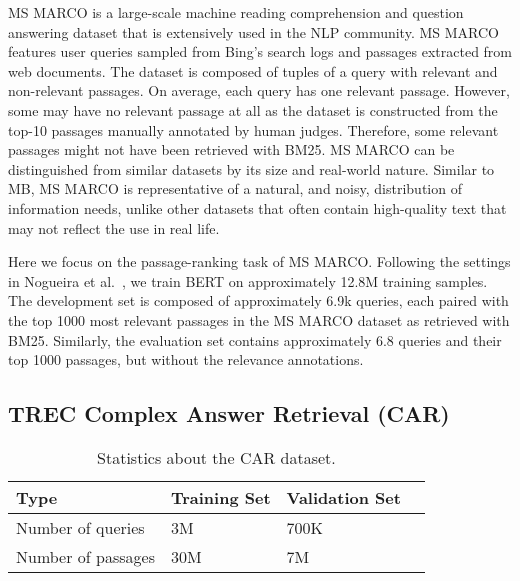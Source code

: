 MS MARCO is a large-scale machine reading comprehension and question answering dataset that is extensively used in the NLP community.
MS MARCO~\cite{nguyen2016msmarco} features user queries sampled from Bing’s search logs and passages extracted from web documents.
The dataset is composed of tuples of a query with relevant and non-relevant passages.
On average, each query has one relevant passage.
However, some may have no relevant passage at all as the dataset is constructed from the top-10 passages manually annotated by human judges.
Therefore, some relevant passages might not have been retrieved with BM25.
MS MARCO can be distinguished from similar datasets by its size and real-world nature.
Similar to MB, MS MARCO is representative of a natural, and noisy, distribution of information needs, unlike other datasets that often contain high-quality text that may not reflect the use in real life.

Here we focus on the passage-ranking task of MS MARCO.
Following the settings in Nogueira et al.~\cite{nogueira2019passage}, we train BERT on approximately 12.8M training samples.
The development set is composed of approximately 6.9k queries, each paired with the top 1000 most relevant passages in the MS MARCO dataset as retrieved with BM25.
Similarly, the evaluation set contains approximately 6.8 queries and their top 1000 passages, but without the relevance annotations.

\subsection{TREC Complex Answer Retrieval (CAR)}

\begin{table}[t!]
\vspace{0.2cm}
\centering
\begin{tabular}{llll}
\toprule
\textbf{Type} \mbox{\hspace{0.5cm}} & \textbf{Training Set} \mbox{\hspace{1.0cm}} & \textbf{Validation Set} \mbox{\hspace{1.0cm}} \\
\toprule
Number of queries & 3M & 700K \\
Number of passages & 30M & 7M \\
\bottomrule
\end{tabular}
\vspace{0.2cm}
\caption{Statistics about the CAR dataset.}
\label{tab:car-stats}
\end{table}

